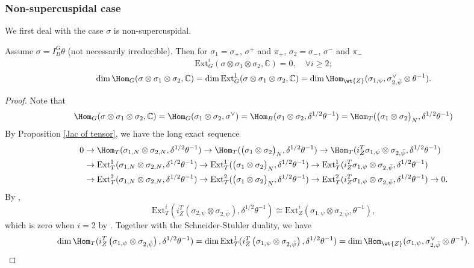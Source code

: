 \documentclass[11pt,reqno]{amsart}
\newcommand{\BC}{{\mathbb {C}}} \newcommand{\BD}{{\mathbb {D}}}
\newcommand{\Ext}{{\mathrm{Ext}}}
\theoremstyle{plain}
\theoremstyle{remark} \newtheorem{remark}[thm]{Remark}
\theoremstyle{definition} \newtheorem{exercise}[thm]{Exercise}
\theoremstyle{definition} \newtheorem{example}[thm]{Example} \newtheorem{condition}[thm]{Condition}
\numberwithin{equation}{section}
\renewcommand{\-}{\text{--}}
\begin{document}
\subsubsection{Non-supercuspidal case}\label{Non-supercuspidal}
We first deal with the case $\sigma$ is non-supercuspidal.
 \begin{prop}\label{PS}Assume  $\sigma=I_B^G\theta$ (not necessarily irreducible). Then  for $\sigma_1=\sigma_+$, $\sigma^+$ and $\pi_+$, $\sigma_2=\sigma_-$, $\sigma^-$ and $\pi_-$
 $$\Ext^i_G(\sigma\otimes \sigma_1\otimes \sigma_2,\BC)=0,\quad \forall i\geq2;$$ 
$$\dim\Hom_G(\sigma\otimes\sigma_1\otimes \sigma_2,\BC)=\dim\Ext^1_G(\sigma\otimes\sigma_1\otimes \sigma_2,\BC)=\dim \Hom_{\wt{Z}}(\sigma_{1,\psi}, \sigma_{2,\bar{\psi}}^\vee\otimes\theta^{-1}).$$
\end{prop}
\begin{proof} Note that  \begin{align*}
\Hom_G(\sigma\otimes\sigma_1\otimes \sigma_2,\BC) =\Hom_{G}( \sigma_1\otimes \sigma_2, \sigma^\vee)=\Hom_{B}(\sigma_1\otimes \sigma_2, \delta^{1/2}\theta^{-1})=\Hom_{T}( \big(\sigma_1\otimes \sigma_2\big)_N,\delta^{1/2}\theta^{-1})
\end{align*}
By Proposition \ref{Jac of tensor}, we have the long exact sequence
\begin{align*}
    0&\to \Hom_T(\sigma_{1,N}\otimes \sigma_{2,N},\delta^{1/2}\theta^{-1})\to \Hom_{T}( \big(\sigma_1\otimes\sigma_2\big)_N,\delta^{1/2}\theta^{-1})\to \Hom_T(i_Z^T\sigma_{1,\psi}\otimes \sigma_{2,\bar{\psi}}, \delta^{1/2}\theta^{-1})\\
  & \to \Ext^1_T(\sigma_{1,N}\otimes \sigma_{2,N}, \delta^{1/2}\theta^{-1})\to \Ext^1_{T}( \big(\sigma_1\otimes\sigma_2\big)_N,\delta^{1/2}\theta^{-1}) \to \Ext^1_T(i_Z^T\sigma_{1,\psi}\otimes \sigma_{2,\bar{\psi}}, \delta^{1/2}\theta^{-1})\\
 & \to \Ext^2_T(\sigma_{1,N}\otimes \sigma_{2,N}, \delta^{1/2}\theta^{-1})
     \to \Ext^2_{T}(\big(\sigma_1\otimes\sigma_2\big)_N,\delta^{1/2}\theta^{-1})
     \to \Ext^2_T(i_Z^T\sigma_{1,\psi}\otimes \sigma_{2,\bar{\psi}}, \delta^{1/2}\theta^{-1})\to0.
\end{align*}
  By \cite[Prop 2.8]{Pra18},$$\Ext^i_T(i_Z^T\left(\sigma_{2,\psi}\otimes \sigma_{2,\bar{\psi}}\right), \delta^{1/2}\theta^{-1})\cong\Ext^i_Z(\sigma_{1,\psi}\otimes \sigma_{2,\bar{\psi}},\theta^{-1}),$$ which is zero when $i=2$ by \cite[Prop 2.9]{Pra18}. Together with the Schneider-Stuhler duality, we have
\begin{align*}\dim\Hom_T(i_Z^T\left(\sigma_{1,\psi}\otimes \sigma_{2,\bar{\psi}}\right), \delta^{1/2}\theta^{-1})=\dim\Ext^1_T(i_Z^T\left(\sigma_{1,\psi}\otimes \sigma_{2,\bar{\psi}}\right), \delta^{1/2}\theta^{-1})=\dim\Hom_{\wt{Z}}(\sigma_{1,\psi}, \sigma_{2,\bar{\psi}}^\vee\otimes\theta^{-1}).

\end{align*}
\end{proof}
\end{document}
